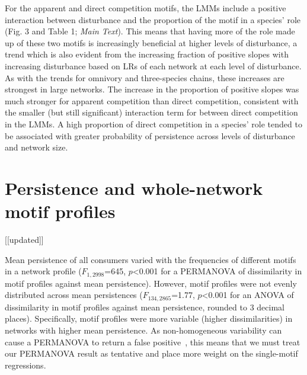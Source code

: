 \documentclass[12pt]{article}
\begin{document}
\begin{spacing}{2.0}
    For the apparent and direct competition motifs, the LMMs include a positive interaction between disturbance and the proportion of the motif in a species' role (Fig. 3 and Table 1; \emph{Main Text}).
    This means that having more of the role made up of these two motifs is increasingly beneficial at higher levels of disturbance, a trend which is also evident from the increasing fraction of positive slopes with increasing disturbance based on LRs of each network at each level of disturbance. %
    As with the trends for omnivory and three-species chains, these increases are strongest in large networks. %
    The increase in the proportion of positive slopes was much stronger for apparent competition than direct competition, consistent with the smaller (but still significant) interaction term for between direct competition in the LMMs.
    A high proportion of direct competition in a species' role tended to be associated with greater probability of persistence across levels of disturbance and network size.
\clearpage
                
\section{Persistence and whole-network motif profiles} [[updated]]

    Mean persistence of all consumers varied with the frequencies of different motifs in a network profile ($F_{1,2998}$=645, $p$\textless0.001 for a PERMANOVA of dissimilarity in motif profiles against mean persistence).
    However, motif profiles were not evenly distributed across mean persistences ($F_{134,2865}$=1.77, $p$\textless0.001 for an ANOVA of dissimilarity in motif profiles against mean persistence, rounded to 3 decimal places).
    Specifically, motif profiles were more variable (higher dissimilarities) in networks with higher mean persistence.
    As non-homogeneous variability can cause a PERMANOVA to return a false positive~\citep{Anderson2001}, this means that we must treat our PERMANOVA result as tentative and place more weight on the single-motif regressions.



\end{spacing}
\end{document}
